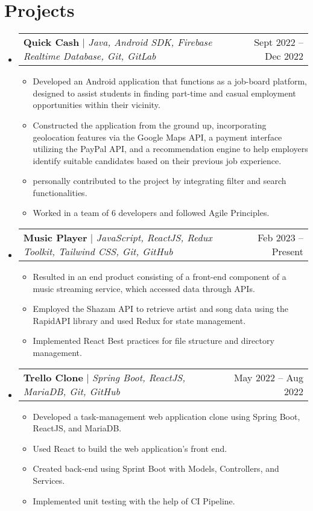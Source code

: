 \documentclass[letterpaper,11pt]{article}
\makeatletter
\newcommand{\resumeItem}[1]{
  \item\small{
    {#1 \vspace{-2pt}}
  }
}
\newcommand{\resumeProjectHeading}[2]{
    \item
    \begin{tabular*}{0.97\textwidth}{l@{\extracolsep{\fill}}r}
      \small#1 & #2 \\
    \end{tabular*}\vspace{-7pt}
}
\newcommand{\resumeSubHeadingListStart}{\begin{itemize}[leftmargin=0.15in, label={}]}
\newcommand{\resumeSubHeadingListEnd}{\end{itemize}}
\newcommand{\resumeItemListStart}{\begin{itemize}}
\newcommand{\resumeItemListEnd}{\end{itemize}\vspace{-5pt}}
\makeatother
\begin{document}
\section{Projects}
    \resumeSubHeadingListStart
       \resumeProjectHeading
          {\textbf{Quick Cash} $|$ \emph{Java, Android SDK, Firebase Realtime Database, Git, GitLab}}{Sept 2022 -- Dec 2022}
          \resumeItemListStart
            \resumeItem{Developed an Android application that functions as a job-board platform, designed to assist students in finding part-time and casual employment opportunities within their vicinity.}
            \resumeItem{Constructed the application from the ground up, incorporating geolocation features via the Google Maps API, a payment interface utilizing the PayPal API, and a recommendation engine to help employers identify suitable candidates based on their previous job experience.}
            \resumeItem{personally contributed to the project by integrating filter and search functionalities.}
            \resumeItem{Worked in a team of 6 developers and followed Agile Principles.}
          \resumeItemListEnd
      \resumeProjectHeading
          {\textbf{Music Player} $|$ \emph{JavaScript, ReactJS, Redux Toolkit, Tailwind CSS, Git, GitHub}}{Feb 2023 -- Present}
          \resumeItemListStart
            \resumeItem{Resulted in an end product consisting of a front-end component of a music streaming service, which accessed data through APIs.}
            \resumeItem{Employed the Shazam API to retrieve artist and song data using the RapidAPI library and used Redux for state management.}
            \resumeItem{Implemented React Best practices for file structure and directory management.}
          \resumeItemListEnd
      
      \resumeProjectHeading
          {\textbf{Trello Clone} $|$ \emph{Spring Boot, ReactJS, MariaDB, Git, GitHub}}{May 2022 -- Aug 2022}
          \resumeItemListStart
            \resumeItem{Developed a task-management web application clone using Spring Boot, ReactJS, and MariaDB.}
            \resumeItem{Used React to build the web application's front end.}
            \resumeItem{Created back-end using Sprint Boot with Models, Controllers, and Services.}
            \resumeItem{Implemented unit testing with the help of CI Pipeline.}
          \resumeItemListEnd
    \resumeSubHeadingListEnd


\end{document}
